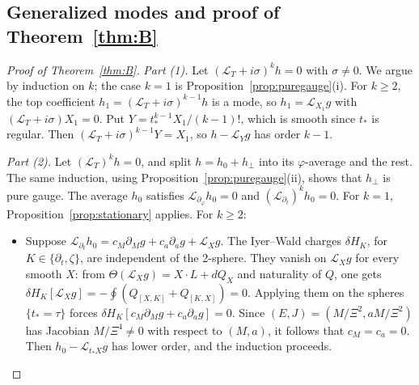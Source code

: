 \documentclass[11pt]{amsart}
\theoremstyle{definition}
\theoremstyle{remark}
\numberwithin{equation}{section}
\newcommand{\cL}{\mathcal{L}}
\begin{document}
\subsection{Generalized modes and proof of Theorem~\ref{thm:B}}
\begin{proof}[Proof of Theorem~\ref{thm:B}]
\emph{Part (1).} Let $(\cL_T+i\sigma)^kh=0$ with $\sigma\ne0$. We argue by induction on $k$; the case $k=1$ is
Proposition~\ref{prop:puregauge}(i). For $k\ge2$, the top coefficient $h_1=(\cL_T+i\sigma)^{k-1}h$ is a mode, so
$h_1=\cL_{X_1}g$ with $(\cL_T+i\sigma)X_1=0$. Put $Y=t_*^{k-1}X_1/(k-1)!$, which is smooth since $t_*$ is regular.
Then $(\cL_T+i\sigma)^{k-1}Y=X_1$, so $h-\cL_Yg$ has order $k-1$.

\emph{Part (2).} Let $(\cL_T)^kh=0$, and split $h=h_0+h_\perp$ into its $\varphi$-average and the rest. The same
induction, using Proposition~\ref{prop:puregauge}(ii), shows that $h_\perp$ is pure gauge. The average $h_0$
satisfies $\cL_{\partial_\varphi}h_0=0$ and $(\cL_{\partial_t})^kh_0=0$. For $k=1$, Proposition~\ref{prop:stationary}
applies. For $k\ge2$:
\begin{itemize}
\item Suppose $\cL_{\partial_t}h_0=c_M\partial_Mg+c_a\partial_ag+\cL_Xg$. The Iyer--Wald charges $\delta H_K$, for
$K\in\{\partial_t,\zeta\}$, are independent of the 2-sphere. They vanish on $\cL_Xg$ for every smooth $X$: from
$\Theta(\cL_Xg)=X\cdot L+dQ_X$ and naturality of $Q$, one gets
$\delta H_K[\cL_Xg]=-\oint(Q_{[X,K]}+Q_{[K,X]})=0$. Applying them on the spheres $\{t_*=\tau\}$ forces
$\delta H_K[c_M\partial_Mg+c_a\partial_ag]=0$. Since $(E,J)=(M/\Xi^2,aM/\Xi^2)$ has Jacobian $M/\Xi^4\ne0$ with
respect to $(M,a)$, it follows that $c_M=c_a=0$. Then $h_0-\cL_{t_*X}g$ has lower order, and the induction
proceeds.
\end{itemize}
\end{proof}

\appendix
\end{document}
